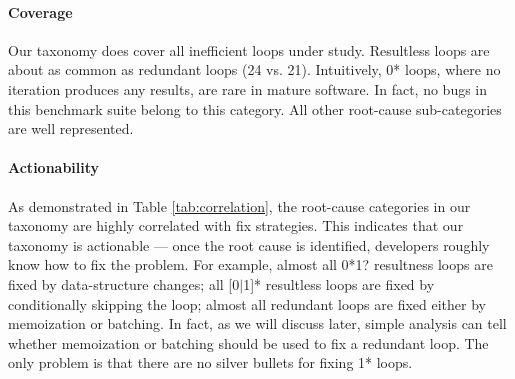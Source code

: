 

\paragraph{Coverage}
Our taxonomy does cover all inefficient loops under study. 
Resultless loops are about as common as redundant loops
(24 vs. 21).
Intuitively, 0* loops, where no iteration produces any results,
are rare in mature software. In fact, no bugs in this
benchmark suite belong to this category.
All other root-cause sub-categories are well represented.


\paragraph{Actionability}
As demonstrated in Table \ref{tab:correlation}, 
the root-cause categories in our taxonomy are highly correlated with
fix strategies.
This indicates that our taxonomy is actionable --- once the root cause
is identified, developers roughly know how to fix the problem.
For example, 
almost all 0*1? resultness loops are fixed by data-structure changes;
all [0$|$1]* resultless loops are
fixed by conditionally skipping the loop;
almost all redundant loops are fixed either by 
memoization or batching. 
In fact, as we will discuss later, simple analysis can tell whether 
memoization or batching should be used to fix a redundant loop.
The only problem is that there are no silver bullets for fixing 1* loops.

